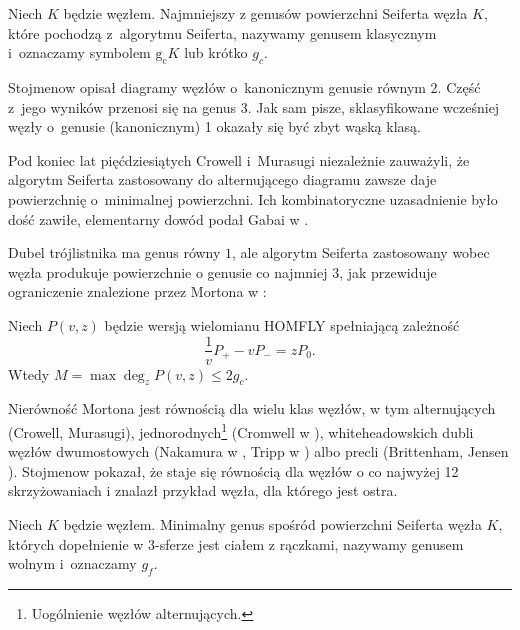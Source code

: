\begin{definition}
%
    Niech $K$ będzie węzłem.
    Najmniejszy z genusów powierzchni Seiferta węzła $K$, które pochodzą z~algorytmu Seiferta, nazywamy genusem klasycznym i~oznaczamy symbolem $\operatorname{g_c} K$ lub krótko $g_c$.
\end{definition}

Stojmenow \cite{stoimenow08} opisał diagramy węzłów o~kanonicznym genusie równym 2.
Część z~jego wyników przenosi się na genus 3.
Jak sam pisze, sklasyfikowane wcześniej węzły o~genusie (kanonicznym) 1 okazały się być zbyt wąską klasą.

Pod koniec lat pięćdziesiątych Crowell i~Murasugi niezależnie zauważyli, że algorytm Seiferta zastosowany do alternującego diagramu zawsze daje powierzchnię o~minimalnej powierzchni.
Ich kombinatoryczne uzasadnienie było dość zawiłe, elementarny dowód podał Gabai w \cite{gabai86}.

Dubel trójlistnika ma genus równy $1$, ale algorytm Seiferta zastosowany wobec węzła produkuje powierzchnie o genusie co najmniej $3$, jak przewiduje ograniczenie znalezione przez Mortona w \cite[twierdzenie 2]{morton86}:

\begin{proposition}
    Niech $P(v, z)$ będzie wersją wielomianu HOMFLY spełniającą zależność
    \begin{equation}
        \frac 1v P_+ - vP_- = zP_0.
    \end{equation}
    Wtedy $M = \max \deg_z P(v, z) \le 2g_c$.
\end{proposition}

Nierówność Mortona jest równością dla wielu klas węzłów, w tym alternujących (Crowell, Murasugi), jednorodnych\footnote{Uogólnienie węzłów alternujących.} (Cromwell w \cite{cromwell89}), whiteheadowskich dubli węzłów dwumostowych (Nakamura w \cite{nakamura06}, Tripp w \cite{tripp02}) albo precli (Brittenham, Jensen \cite{brittenham06}).
%
%
%
%
%
%
Stojmenow pokazał, że staje się równością dla węzłów o co najwyżej 12 skrzyżowaniach i znalazł przykład węzła, dla którego jest ostra.

\begin{definition}
    Niech $K$ będzie węzłem.
    Minimalny genus spośród powierzchni Seiferta węzła $K$, których dopełnienie w 3-sferze jest ciałem z rączkami, nazywamy genusem wolnym i~oznaczamy $g_f$.
\end{definition}

